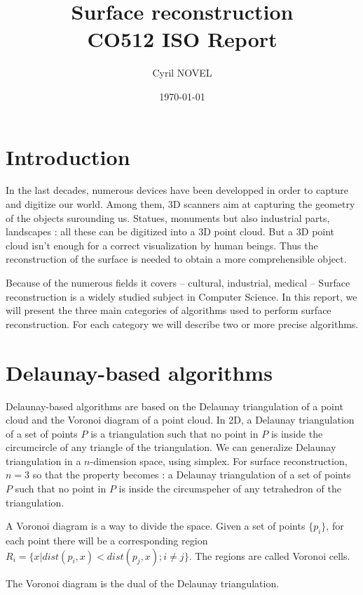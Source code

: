\documentclass[a4paper]{article}
\title{Surface reconstruction\\
\large{CO512 ISO Report}}
\author{Cyril NOVEL}
\date{\today}
\begin{document}
\maketitle
\newpage

\tableofcontents

\newpage

\section*{Introduction}
In the last decades, numerous devices have been developped in order to capture and digitize our world. Among them, 3D scanners aim at capturing the geometry of the objects surounding us. Statues, monuments but also industrial parts, landscapes : all these can be digitized into a 3D point cloud. But a 3D point cloud isn't enough for a correct visualization by human beings. Thus the reconstruction of the surface is needed to obtain a more comprehensible object.

Because of the numerous fields it covers -- cultural, industrial, medical -- Surface reconstruction is a widely studied subject in Computer Science. In this report, we will present the three main categories of algorithms used to perform surface reconstruction. For each category we will describe two or more precise algorithms.

\newpage

\section{Delaunay-based algorithms}
Delaunay-based algorithms are based on the Delaunay triangulation of a point cloud and the Voronoi diagram of a point cloud. In 2D, a Delaunay triangulation of a set of points $P$ is a triangulation such that no point in $P$ is inside the circumcircle of any triangle of the triangulation. We can generalize Delaunay triangulation in a $n$-dimension space, using simplex. For surface reconstruction, $n = 3$ so that the property becomes : a Delaunay triangulation of a set of points $P$ such that no point in $P$ is inside the circumspeher of any tetrahedron of the triangulation.

A Voronoi diagram is a way to divide the space. Given a set of points $\{p_i\}$,  for each point there will be a corresponding region $R_i = \{x | dist(p_i,x) < dist(p_j,x) ; i \ne j\}$. The regions are called Voronoi cells.

The Voronoi diagram is the dual of the Delaunay triangulation.
\end{document}
